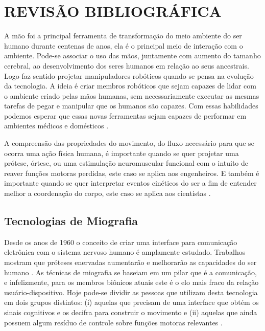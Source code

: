 
\chapter{REVISÃO BIBLIOGRÁFICA}\label{cap2}

A mão foi a principal ferramenta de transformação do meio ambiente do ser humano durante centenas de anos, ela é o principal meio de interação com o ambiente. Pode-se associar o uso das mãos, juntamente com aumento do tamanho cerebral, ao desenvolvimento dos seres humanos em relação ao seus ancestrais. Logo faz sentido projetar manipuladores robóticos quando se pensa na evolução da tecnologia. A ideia é criar membros robóticos que sejam capazes de lidar com o ambiente criado pelas mãos humanas, sem necessariamente executar as mesmas tarefas de pegar e manipular que os humanos são capazes. Com essas habilidades podemos esperar que essas novas ferramentas sejam capazes de performar em ambientes médicos e domésticos \cite{gustus2012human}.

A compreensão das propriedades do movimento, do fluxo necessário para que se ocorra uma ação física humana, é importante quando se quer projetar uma prótese, órtese, ou uma estimulação neuromuscular funcional com o intuito de reaver funções motoras perdidas, este caso se aplica aos engenheiros. E também é importante quando se quer interpretar eventos cinéticos do ser a fim de entender melhor a coordenação do corpo, este caso se aplica aos cientistas \cite{zajac1989muscle}.

\section{Tecnologias de Miografia}\label{cap2:sub2}

Desde os anos de 1960 o conceito de criar uma interface para comunicação eletrônica com o sistema nervoso humano é amplamente estudado. Trabalhos mostram que próteses enervadas aumentarão e melhorarão as capacidades do ser humano \cite{gasson2005invasive}.  As técnicas de miografia se baseiam em um pilar que é a comunicação, e infelizmente, para os membros biônicos atuais este é o elo mais fraco da relação usuário-dispositivo. Hoje pode-se dividir as pessoas que utilizam desta tecnologia em dois grupos distintos: (i) aquelas que precisam de uma interface que obtém os sinais cognitivos e os decifra para construir o movimento e (ii) aquelas que ainda possuem algum resíduo  de controle sobre funções motoras relevantes \cite{craelius2002}. 

